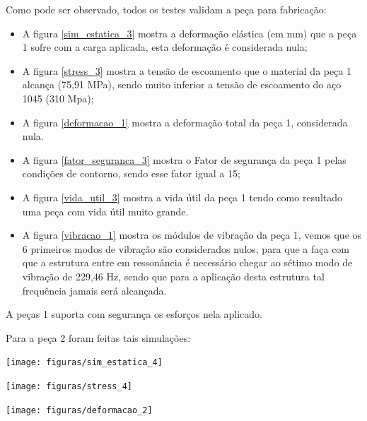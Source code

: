     Como pode ser observado, todos os testes validam a peça para fabricação:
    \begin{itemize}
        \item A figura \ref{sim_estatica_3} mostra a deformação elástica (em mm) que a peça 1 sofre com a carga aplicada, esta deformação é considerada nula;
        \item A figura \ref{stress_3} mostra a tensão de escoamento que o material da peça 1 alcança (75,91 MPa), sendo muito inferior a tensão de escoamento do aço 1045 (310 Mpa);
        \item A figura \ref{deformacao_1} mostra a deformação total da peça 1, considerada nula.
        \item A figura \ref{fator_seguranca_3} mostra o Fator de segurança da peça 1 pelas condições de contorno, sendo esse fator igual a 15;
        \item A figura \ref{vida_util_3} mostra a vida útil da peça 1 tendo como resultado uma peça com vida útil muito grande.
        \item A figura \ref{vibracao_1} mostra os módulos de vibração da peça 1, vemos que os 6 primeiros modos de vibração são considerados nulos, para que a faça com que a estrutura entre em ressonância é necessário chegar ao sétimo modo de vibração de 229,46 Hz, sendo que para a aplicação desta estrutura tal frequência jamais será alcançada.
    \end{itemize}
    
    A peças 1 suporta com segurança os esforços nela aplicado.
 
    Para a peça 2 foram feitas tais simulações:
 

    \begin{center}
    	\texttt{[image: figuras/sim\_estatica\_4]}
        \label{sim_estatica_4}
    \end{center}
    
    \begin{center}
    	\texttt{[image: figuras/stress\_4]}
        \label{stress_4}
    \end{center}
  
    \begin{center}
    	\texttt{[image: figuras/deformacao\_2]}
        \label{deformacao_2}
    \end{center}

